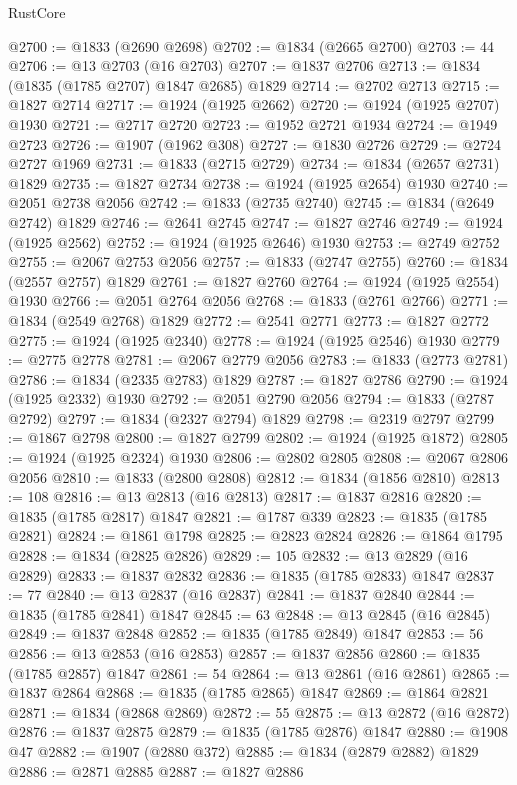 \begin{lexlean}{RustCore}
\begin{coremodule}
@2700 := @1833 (@2690 @2698)
@2702 := @1834 (@2665 @2700)
@2703 := 44
@2706 := @13 @2703 (@16 @2703)
@2707 := @1837 @2706
@2713 := @1834 (@1835 (@1785 @2707) @1847 @2685) @1829
@2714 := @2702 @2713
@2715 := @1827 @2714
@2717 := @1924 (@1925 @2662)
@2720 := @1924 (@1925 @2707) @1930
@2721 := @2717 @2720
@2723 := @1952 @2721 @1934
@2724 := @1949 @2723
@2726 := @1907 (@1962 @308)
@2727 := @1830 @2726
@2729 := @2724 @2727 @1969
@2731 := @1833 (@2715 @2729)
@2734 := @1834 (@2657 @2731) @1829
@2735 := @1827 @2734
@2738 := @1924 (@1925 @2654) @1930
@2740 := @2051 @2738 @2056
@2742 := @1833 (@2735 @2740)
@2745 := @1834 (@2649 @2742) @1829
@2746 := @2641 @2745
@2747 := @1827 @2746
@2749 := @1924 (@1925 @2562)
@2752 := @1924 (@1925 @2646) @1930
@2753 := @2749 @2752
@2755 := @2067 @2753 @2056
@2757 := @1833 (@2747 @2755)
@2760 := @1834 (@2557 @2757) @1829
@2761 := @1827 @2760
@2764 := @1924 (@1925 @2554) @1930
@2766 := @2051 @2764 @2056
@2768 := @1833 (@2761 @2766)
@2771 := @1834 (@2549 @2768) @1829
@2772 := @2541 @2771
@2773 := @1827 @2772
@2775 := @1924 (@1925 @2340)
@2778 := @1924 (@1925 @2546) @1930
@2779 := @2775 @2778
@2781 := @2067 @2779 @2056
@2783 := @1833 (@2773 @2781)
@2786 := @1834 (@2335 @2783) @1829
@2787 := @1827 @2786
@2790 := @1924 (@1925 @2332) @1930
@2792 := @2051 @2790 @2056
@2794 := @1833 (@2787 @2792)
@2797 := @1834 (@2327 @2794) @1829
@2798 := @2319 @2797
@2799 := @1867 @2798
@2800 := @1827 @2799
@2802 := @1924 (@1925 @1872)
@2805 := @1924 (@1925 @2324) @1930
@2806 := @2802 @2805
@2808 := @2067 @2806 @2056
@2810 := @1833 (@2800 @2808)
@2812 := @1834 (@1856 @2810)
@2813 := 108
@2816 := @13 @2813 (@16 @2813)
@2817 := @1837 @2816
@2820 := @1835 (@1785 @2817) @1847
@2821 := @1787 @339
@2823 := @1835 (@1785 @2821)
@2824 := @1861 @1798
@2825 := @2823 @2824
@2826 := @1864 @1795
@2828 := @1834 (@2825 @2826)
@2829 := 105
@2832 := @13 @2829 (@16 @2829)
@2833 := @1837 @2832
@2836 := @1835 (@1785 @2833) @1847
@2837 := 77
@2840 := @13 @2837 (@16 @2837)
@2841 := @1837 @2840
@2844 := @1835 (@1785 @2841) @1847
@2845 := 63
@2848 := @13 @2845 (@16 @2845)
@2849 := @1837 @2848
@2852 := @1835 (@1785 @2849) @1847
@2853 := 56
@2856 := @13 @2853 (@16 @2853)
@2857 := @1837 @2856
@2860 := @1835 (@1785 @2857) @1847
@2861 := 54
@2864 := @13 @2861 (@16 @2861)
@2865 := @1837 @2864
@2868 := @1835 (@1785 @2865) @1847
@2869 := @1864 @2821
@2871 := @1834 (@2868 @2869)
@2872 := 55
@2875 := @13 @2872 (@16 @2872)
@2876 := @1837 @2875
@2879 := @1835 (@1785 @2876) @1847
@2880 := @1908 @47
@2882 := @1907 (@2880 @372)
@2885 := @1834 (@2879 @2882) @1829
@2886 := @2871 @2885
@2887 := @1827 @2886

\end{coremodule}
\end{lexlean}
